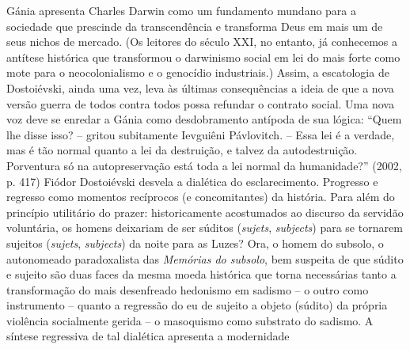 Gánia apresenta Charles Darwin como um fundamento mundano para a
sociedade que prescinde da transcendência e transforma Deus em mais um
de seus nichos de mercado. (Os leitores do século XXI, no entanto, já
conhecemos a antítese histórica que transformou o darwinismo social em
lei do mais forte como mote para o neocolonialismo e o genocídio
industriais.) Assim, a escatologia de Dostoiévski, ainda uma vez, leva
às últimas consequências a ideia de que a nova versão guerra de todos
contra todos possa refundar o contrato social. Uma nova voz deve se
enredar a Gánia como desdobramento antípoda de sua lógica: ``Quem lhe
disse isso? -- gritou subitamente Ievguiêni Pávlovitch. -- Essa lei é a
verdade, mas é tão normal quanto a lei da destruição, e talvez da
autodestruição. Porventura só na autopreservação está toda a lei normal
da humanidade?'' (2002, p. 417) Fiódor Dostoiévski desvela a dialética
do esclarecimento. Progresso e regresso como momentos recíprocos (e
concomitantes) da história. Para além do princípio utilitário do prazer:
historicamente acostumados ao discurso da servidão voluntária, os homens
deixariam de ser súditos (\emph{sujets}, \emph{subjects}) para se
tornarem sujeitos (\emph{sujets}, \emph{subjects}) da noite para as
Luzes? Ora, o homem do subsolo, o autonomeado paradoxalista das
\emph{Memórias do subsolo}, bem suspeita de que súdito e sujeito são
duas faces da mesma moeda histórica que torna necessárias tanto a
transformação do mais desenfreado hedonismo em sadismo -- o outro como
instrumento -- quanto a regressão do eu de sujeito a objeto (súdito) da
própria violência socialmente gerida -- o masoquismo como substrato do
sadismo. A síntese regressiva de tal dialética apresenta a modernidade
